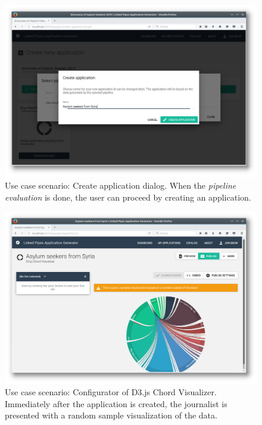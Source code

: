 \begin{figure}
	\centering
	\includegraphics[width=145mm]{img/05_scenario_03_create_application.png}
	\caption{Use case scenario: Create application dialog. When the \emph{pipeline evaluation} is done, the user can proceed by creating an application.}
	\label{fig:scenario-03-create-application}
\end{figure}

\begin{figure}
	\centering
	\includegraphics[width=145mm]{img/05_scenario_04_graph_sample.png}
	\caption{Use case scenario: Configurator of D3.js Chord Visualizer. Immediately after the application is created, the journalist is presented with a random sample visualization of the data.}
	\label{fig:scenario-04-graph-sample}
\end{figure}

